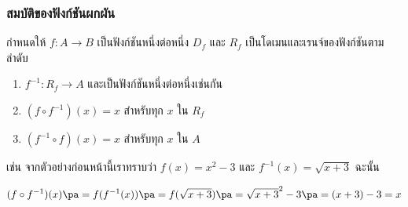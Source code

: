 \begin{frame}[t]
\frametitle{สมบัติของฟังก์ชันผกผัน}
\begin{prop}{}{}
กำหนดให้ $f: A \to B$ เป็นฟังก์ชันหนึ่งต่อหนึ่ง $D_f$ และ $R_f$ เป็นโดเมนและเรนจ์ของฟังก์ชันตามลำดับ
\begin{enumerate}
\item $f^{-1}: R_f \to A$ และเป็นฟังก์ชันหนึ่งต่อหนึ่งเช่นกัน
\item $(f \circ f^{-1}) (x) = x$ สำหรับทุก $x$ ใน $R_f$
\item $(f^{-1} \circ f)(x) = x$ สำหรับทุก $x$ ใน $A$
\end{enumerate}
\end{prop}
เช่น จากตัวอย่างก่อนหน้านี้เราทราบว่า $f(x) = x^2-3$ และ $f^{-1}(x) = \sqrt{x+3}$ ฉะนั้น
\begin{slide}
\[(f \circ f^{-1})(x) \pa = f( f^{-1}(x)) \pa = f( \sqrt{x+3} ) \pa = \sqrt{x+3}^2 - 3 \pa = (x+3) - 3 = x\]
\end{slide}
\end{frame}